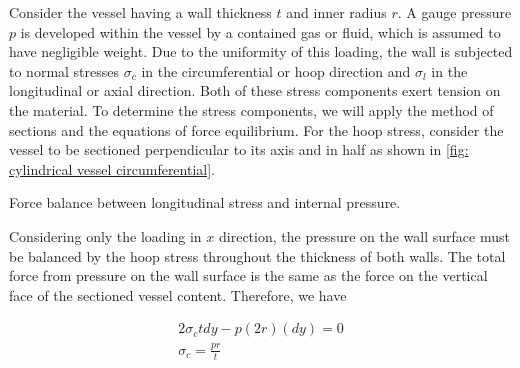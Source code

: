 \documentclass[
fontsize=10pt,
a4paper,
twosides=false,
open=any,
svgnames,
]{kaobook} %
\begin{document}
Consider the vessel having a wall thickness $t$ and inner radius $r$. A gauge pressure $p$ is developed within the vessel by a contained gas or fluid, which is assumed to have negligible weight. Due to the uniformity of this loading, the wall is subjected to normal stresses $\sigma_c$ in the circumferential or hoop direction and $\sigma_l$ in the longitudinal or axial direction. Both of these stress components exert tension on the material. To determine the stress components, we will apply the method of sections and the equations of force equilibrium. For the hoop stress, consider the vessel to be sectioned perpendicular to its axis and in half as shown in \cref{fig: cylindrical vessel circumferential}.

\begin{marginfigure}
  \centering
  \caption{Force balance between longitudinal stress and internal pressure.}
  \label{fig: cylindrical vessel longitudinal}
\end{marginfigure}

Considering only the loading in $x$ direction, the pressure on the wall surface must be balanced by the hoop stress throughout the thickness of both walls. The total force from pressure on the wall surface is the same as the force on the vertical face of the sectioned vessel content. Therefore, we have

\begin{equation}
  \begin{gathered}
    2\sigma _ctdy - p(2r)(dy) = 0 \\ 
    {\sigma _c} = \frac{pr}{t} \\ 
  \end{gathered}
\end{equation}
\end{document}
